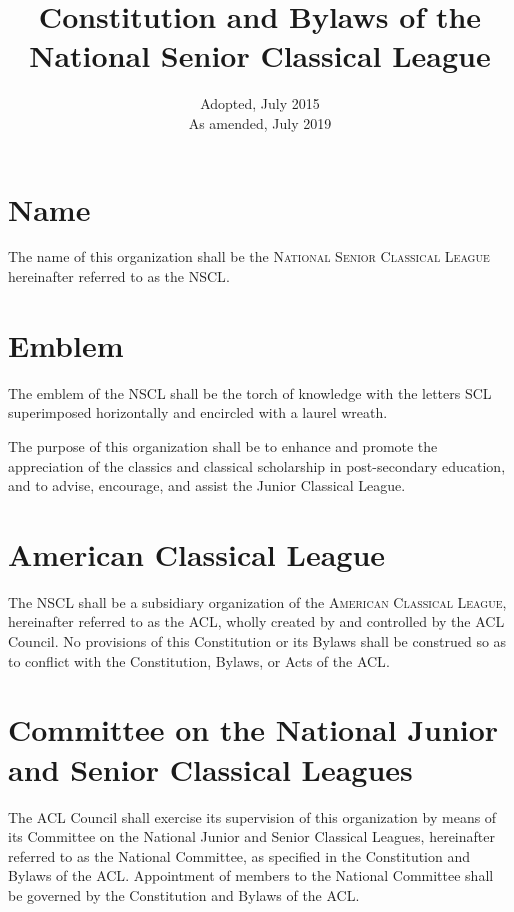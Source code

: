 \documentclass{bylaws_nofont}
\title{Constitution and Bylaws of the National Senior Classical League}
\date{
  Adopted, July 2015\\
  As amended, July 2019
}
\newcommand{\NSCL}{\textsc{NSCL}\xspace}
\newcommand{\SCL}{\textsc{SCL}\xspace}
\newcommand{\ACL}{\textsc{ACL}\xspace}
\begin{document}
\maketitle

\begin{linenumbers}[1]

  

  \section{Name}
  The name of this organization shall be the \textsc{National Senior
    Classical League} hereinafter referred to as the \NSCL.\\

  \section{Emblem}
  The emblem of the \NSCL shall be the torch of knowledge with the
  letters \SCL superimposed horizontally and encircled with a laurel
  wreath.\\


  The purpose of this organization shall be to enhance and promote the
  appreciation of the classics and classical scholarship in
  post-secondary education, and to advise, encourage, and assist the
  Junior Classical League.\\


  \section{American Classical League}
  The \NSCL shall be a subsidiary organization of the \textsc{American
    Classical League}, hereinafter referred to as the \ACL, wholly
  created by and controlled by the \ACL Council. No provisions of this
  Constitution or its Bylaws shall be construed so as to conflict with
  the Constitution, Bylaws, or Acts of the \ACL.\\

  \section{Committee on the National Junior and Senior Classical
    Leagues}
  \begin{enumerate}
    The \ACL Council shall exercise its supervision of this organization
    by means of its Committee on the National Junior and Senior
    Classical Leagues, hereinafter referred to as the National
    Committee, as specified in the Constitution and Bylaws of the
    \ACL. Appointment of members to the National Committee shall be
    governed by the Constitution and Bylaws of the \ACL.
    

\end{enumerate}
\end{linenumbers}
\end{document}
